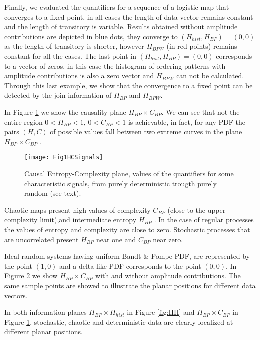Finally, we evaluated the quantifiers for a sequence of a logistic map that converges to a fixed point, in all cases the length of data vector remains constant and the length of transitory is variable.
Results obtained without amplitude contributions are depicted in blue dots, they converge to $(H_{hist}, H_{BP})=(0, 0)$ as the length of transitory is shorter, however $H_{BPW}$ (in red points) remains constant for all the cases.
The last point in $(H_{hist}, H_{BP})=(0, 0)$ corresponds to a vector of zeros, in this case the histogram of ordering patterns with amplitude contributions is also a zero vector and $H_{BPW}$ can not be calculated.
Through this last example, we show that the convergence to a fixed point can be detected by the join information of $H_{BP}$ and $H_{BPW}$.

In Figure \ref{fig:HC} we show the causality plane $H_{BP} \times C_{BP}$.
We can see that not the entire region $0<H_{BP}<1$, $0<C_{BP}<1$ is achievable, in fact, for any PDF the pairs $(H,C)$ of possible values fall between two extreme curves in the plane $H_{BP} \times C_{BP}$ \cite{Anteneodo1996}.
\begin{figure}[H]
	\centering		
	\texttt{[image: Fig1HCSignals]}
	\caption{Causal Entropy-Complexity plane, values of the quantifiers for some characteristic signals, from purely deterministic trougth purely random (see text).}
	\label{fig:HC}
\end{figure}

Chaotic maps present high values of complexity $C_{BP}$ (close to the upper complexity limit),and intermediate entropy $H_{BP}$ \cite{Rosso2007a,Olivares2012}.
In the case of regular processes the values of entropy and complexity are close to zero. 
Stochastic processes that are uncorrelated present $H_{BP}$ near one and $C_{BP}$ near zero.

Ideal random systems having uniform Bandt \& Pompe PDF, are represented by the point $(1,0)$ \cite{Gonzalez2005} and a delta-like PDF corresponds to the point $(0,0)$.
In Figure 2 we show $H_{BP} \times C_{BP}$ with and without amplitude contributions.
The same sample points are showed to illustrate the planar positions for different data vectors.

In both information planes $H_{BP} \times H_{hist}$ in Figure \ref{fig:HH} and $H_{BP} \times C_{BP}$ in Figure \ref{fig:HC}, stochastic, chaotic and deterministic data are clearly localized at different planar positions.


